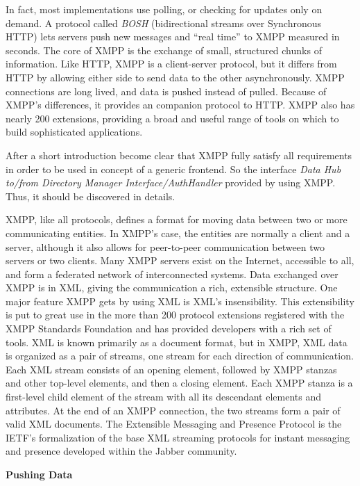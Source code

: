       In fact, most implementations use polling, or checking for updates only on demand. A protocol called \emph{BOSH} (bidirectional streams over Synchronous HTTP) lets servers push new messages and ``real time'' to XMPP measured in seconds. The core of XMPP is the exchange of small, structured chunks of information. Like HTTP, XMPP is a client-server protocol, but it differs from HTTP by allowing either side to send data to the other asynchronously. XMPP connections are long lived, and data is pushed instead of pulled. Because of XMPP’s differences, it provides an 
      companion protocol to HTTP. XMPP also has nearly 200 extensions, providing a broad and useful range of tools on which to build sophisticated applications. 

      After a short introduction become clear that XMPP fully satisfy all requirements in order to be used in concept of a generic frontend. So the interface \emph{Data Hub to/from Directory Manager Interface/AuthHandler} provided by using XMPP. Thus, it should be discovered in details.
   
      XMPP, like all protocols, defines a format for moving data between two or more communicating entities. In XMPP’s case, the entities are normally a client and a server, although it also allows for peer-to-peer communication between two servers or two clients. Many XMPP servers exist on the Internet, accessible to all, and form a federated network of interconnected systems. Data exchanged over XMPP is in XML, giving the communication a rich, extensible structure. One major feature XMPP gets by using XML is XML's insensibility. This extensibility is put to great use in the more than 200 protocol extensions registered with the XMPP Standards Foundation and has provided developers with a rich set of tools. XML is known primarily as a document format, but in XMPP, XML data is organized as a pair of streams, one stream for each direction of communication. Each XML stream consists of an opening element, followed by XMPP stanzas and other top-level elements, and then a closing element. Each XMPP stanza is a first-level child element of the stream with all its descendant elements and attributes. At the end of an XMPP connection, the two streams form a pair of valid XML documents. The Extensible Messaging and Presence Protocol is the IETF's formalization of the base XML streaming protocols for instant messaging and presence developed within the Jabber community\cite{xmpp}.

      \textbf{Pushing Data}


